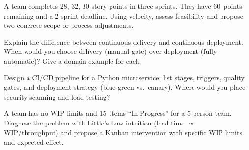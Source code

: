 \begin{exercise}
A team completes 28, 32, 30 story points in three sprints. They have 60~points remaining and a 2-sprint deadline. Using velocity, assess feasibility and propose two concrete scope or process adjustments.
\end{exercise}

\begin{exercise}
Explain the difference between continuous delivery and continuous deployment. When would you choose delivery (manual gate) over deployment (fully automatic)? Give a domain example for each.
\end{exercise}

\begin{exercise}
Design a CI/CD pipeline for a Python microservice: list stages, triggers, quality gates, and deployment strategy (blue-green vs.\ canary). Where would you place security scanning and load testing?
\end{exercise}

\begin{exercise}
A team has no WIP limits and 15~items ``In Progress'' for a 5-person team. Diagnose the problem with Little's Law intuition (lead time $\propto$ WIP/throughput) and propose a Kanban intervention with specific WIP limits and expected effect.
\end{exercise}
